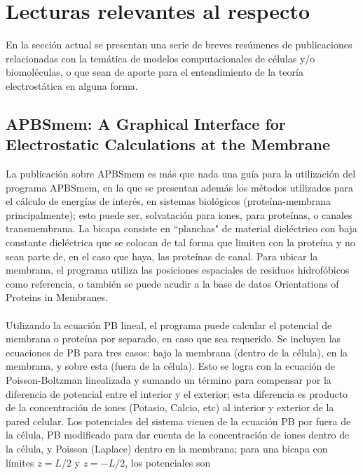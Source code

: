 \documentclass[12pt, notitlepage]{article}
\begin{document}



\section{Lecturas relevantes al respecto}
En la sección actual se presentan una serie de breves resúmenes de publicaciones relacionadas con la temática de modelos computacionales de células y/o biomoléculas, o que sean de aporte para el entendimiento de la teoría electrostática en alguna forma.
\subsection{APBSmem: A Graphical Interface for Electrostatic Calculations at the Membrane \cite{APBSmem}}
La publicación sobre APBSmem es más que nada una guía para la utilización del programa APBSmem, en la que se presentan además los métodos utilizados para el cálculo de energías de interés, en sistemas biológicos (proteína-membrana principalmente); esto puede ser, solvatación para iones, para proteínas, o canales transmembrana. 
La bicapa consiste en ``planchas" de material dieléctrico con baja constante dieléctrica que se colocan de tal forma que limiten con la proteína y no sean parte de, en el caso que haya, las proteínas de canal. Para ubicar la membrana, el programa utiliza las posiciones espaciales de residuos hidrofóbicos como referencia, o también se puede acudir a la base de datos Orientations of Proteins in Membranes.\\\\
Utilizando la ecuación PB lineal, el programa puede calcular el potencial de membrana o proteína por separado, en caso que sea requerido. Se incluyen las ecuaciones de PB para tres casos: bajo la membrana (dentro de la célula), en la membrana, y sobre esta (fuera de la célula). Esto se logra con la ecuación de Poisson-Boltzman linealizada y sumando un término para compensar por la diferencia de potencial entre el interior y el exterior; esta diferencia es producto de la concentración de iones (Potasio, Calcio, etc) al interior y exterior de la pared celular. Los potenciales del sistema vienen de la ecuación PB por fuera de la célula, PB modificado para dar cuenta de la concentración de iones dentro de la célula, y Poisson (Laplace) dentro en la membrana; para una bicapa con límites $z = L/2$ y $z = -L/2$, los potenciales son
\end{document}

